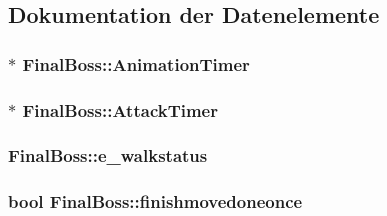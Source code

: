 \subsection{Dokumentation der Datenelemente}
\hypertarget{class_final_boss_a0a5394a3c3202914a2aaf3f80cc89b77}{
\subsubsection[{Animation\-Timer}]{$\ast$ Final\-Boss\-::\-Animation\-Timer\hspace{0.3cm}{\ttfamily [private]}}}\label{class_final_boss_a0a5394a3c3202914a2aaf3f80cc89b77}
\hypertarget{class_final_boss_a51782ed6b05ffd27a37dbbb4255da480}{
\subsubsection[{Attack\-Timer}]{$\ast$ Final\-Boss\-::\-Attack\-Timer\hspace{0.3cm}{\ttfamily [private]}}}\label{class_final_boss_a51782ed6b05ffd27a37dbbb4255da480}
\hypertarget{class_final_boss_a6fc89543b9381f89286223d77c89bc5d}{
\subsubsection[{e\-\_\-walkstatus}]{ Final\-Boss\-::e\-\_\-walkstatus\hspace{0.3cm}{\ttfamily [private]}}}\label{class_final_boss_a6fc89543b9381f89286223d77c89bc5d}
\hypertarget{class_final_boss_a8a20a34a6d12893b7a68fced0a89fdbb}{
\subsubsection[{finishmovedoneonce}]{\setlength{\rightskip}{0pt plus 5cm}bool Final\-Boss\-::finishmovedoneonce\hspace{0.3cm}{\ttfamily [private]}}}\label{class_final_boss_a8a20a34a6d12893b7a68fced0a89fdbb}
